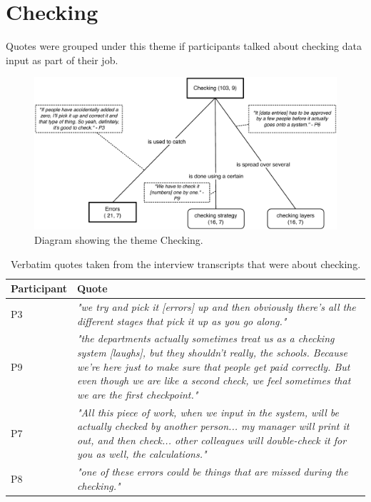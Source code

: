 \section{Checking}\label{subsec:Checking}
Quotes were grouped under this theme if participants talked about checking data input as part of their job. 

\begin{figure}[!ht]
\centering
\includegraphics[width=\textwidth]{images/ch12/Checking.pdf}
\caption[Study 1 Checking diagram]{Diagram showing the theme Checking.}
\vspace{-9pt}
\label{fig:ch3_checking}
\end{figure}

\newpage

\begin{table}[htp]
\centering
    \begin{tabular}{ | l | p{10cm} |}
    \hline
     \textbf{Participant} & \textbf{Quote} \\ \hline
    P3 & \textit{"we try and pick it [errors] up and then obviously there's all the different stages that pick it up as you go along."}\\ \hline
    P9 & \textit{"the departments actually sometimes treat us as a checking system [laughs], but they shouldn't really, the schools. Because we're here just to make sure that people get paid correctly. But even though we are like a second check, we feel sometimes that we are the first checkpoint."} \\ \hline
    P7 & \textit{"All this piece of work, when we input in the system, will be actually checked by another person... my manager will print it out, and then check... other colleagues will double-check it for you as well, the calculations."} \\ \hline
    P8 & \textit{"one of these errors could be things that are missed during the checking."} \\ \hline

    \hline
    \end{tabular}
    \caption[Study 1 checking quotes]{Verbatim quotes taken from the interview transcripts that were about checking.}
    \label{table:ch3_checkingquotes}
\end{table}%

